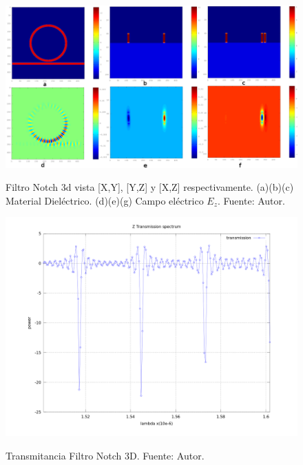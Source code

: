 \begin{figure}[H]
\caption{Filtro Notch 3d vista [X,Y], [Y,Z] y [X,Z] respectivamente. (a)(b)(c) Material Dieléctrico. (d)(e)(g) Campo eléctrico $E_z$. Fuente: Autor.}
\centering
\includegraphics[width=1.0\textwidth,natwidth=900,natheight=500]{figs/notch3d.png}
\label{fig:notch_geometry}
\end{figure}

\begin{figure}[H]
\caption{Transmitancia Filtro Notch 3D. Fuente: Autor.}
\centering
\includegraphics[width=1.0\textwidth,natwidth=1200,natheight=900]{figs/notch3d_T.png}
\label{fig:meep_res_n}
\end{figure}

